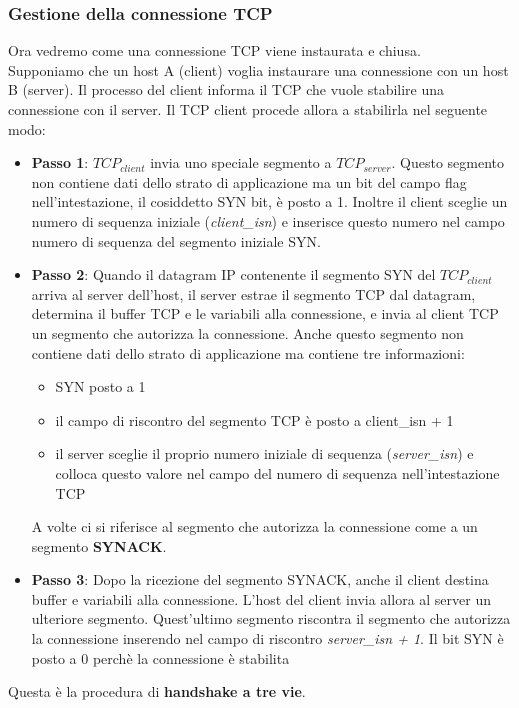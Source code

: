 \documentclass[11pt,a4paper]{article}
\begin{document}
\subsubsection{Gestione della connessione TCP}
Ora vedremo come una connessione TCP viene instaurata e chiusa. \\
Supponiamo che un host A (client) voglia instaurare una connessione con un host B (server). Il processo del client informa il TCP che vuole stabilire una connessione con il server. Il TCP client procede allora a stabilirla nel seguente modo:
\begin{itemize}
	\item \textbf{Passo 1}: $TCP_{client}$ invia uno speciale segmento a $TCP_{server}$. Questo segmento non contiene dati dello strato di applicazione ma un bit del campo flag nell'intestazione, il cosiddetto SYN bit, è posto a 1. Inoltre il client sceglie un numero di sequenza iniziale (\emph{client\_isn}) e inserisce questo numero nel campo numero di sequenza del segmento iniziale SYN.
	\item \textbf{Passo 2}: Quando il datagram IP contenente il segmento SYN del $TCP_{client}$ arriva al server dell'host, il server estrae il segmento TCP dal datagram, determina il buffer TCP e le variabili alla connessione, e invia al client TCP un segmento che autorizza la connessione. Anche questo segmento non contiene dati dello strato di applicazione ma contiene tre informazioni:
		\begin{itemize}
			\item SYN posto a 1
			\item il campo di riscontro del segmento TCP è posto a client\_isn + 1
			\item il server sceglie il proprio numero iniziale di sequenza (\emph{server\_isn}) e colloca questo valore nel campo del numero di sequenza nell'intestazione TCP	
		\end{itemize}
		A volte ci si riferisce al segmento che autorizza la connessione come a un segmento \textbf{SYNACK}.
	\item \textbf{Passo 3}: Dopo la ricezione del segmento SYNACK, anche il client destina buffer e variabili alla connessione. L'host del client invia allora al server un ulteriore segmento. Quest'ultimo segmento riscontra il segmento che autorizza la connessione inserendo nel campo di riscontro \emph{server\_isn + 1}. Il bit SYN è posto a 0 perchè la connessione è stabilita
\end{itemize}
Questa è la procedura di \textbf{handshake a tre vie}.
\end{document}
